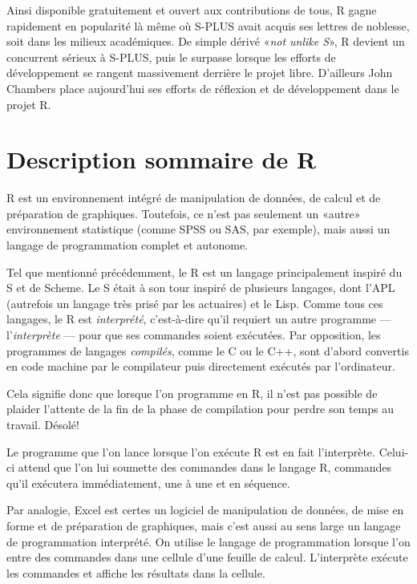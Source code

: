\documentclass[11pt,french]{memoir}
\begin{document}
Ainsi disponible gratuitement et ouvert aux contributions de tous,
R gagne rapidement en popularité là même où S-PLUS avait acquis ses
lettres de noblesse, soit dans les milieux académiques. De simple
dérivé «\emph{not unlike S}», R devient un concurrent sérieux à
S-PLUS, puis le surpasse lorsque les efforts de développement se
rangent massivement derrière le projet libre. D'ailleurs John Chambers
place aujourd'hui ses efforts de réflexion et de développement dans le
projet R.


\section{Description sommaire de R}
\label{sec:rpresentation:description}

R est un environnement intégré de manipulation de données, de calcul
et de préparation de graphiques. Toutefois, ce n'est pas seulement un
«autre» environnement statistique (comme SPSS ou SAS, par exemple),
mais aussi un langage de programmation complet et autonome.

Tel que mentionné précédemment, le R est un langage principalement
inspiré du S et de Scheme. Le S était à son tour inspiré de plusieurs
langages, dont l'APL (autrefois un langage très prisé par les
actuaires) et le Lisp. Comme tous ces langages, le R est
\emph{interprété}, c'est-à-dire qu'il requiert un autre programme ---
l'\emph{interprète} --- pour que ses commandes soient exécutées. Par
opposition, les programmes de langages \emph{compilés}, comme le C ou
le C++, sont d'abord convertis en code machine par le compilateur puis
directement exécutés par l'ordinateur.

Cela signifie donc que lorsque l'on programme en R, il n'est pas
possible de plaider l'attente de la fin de la phase de compilation
pour perdre son temps au travail. Désolé!

Le programme que l'on lance lorsque l'on exécute R est en fait
l'interprète. Celui-ci attend que l'on lui soumette des commandes dans
le langage R, commandes qu'il exécutera immédiatement, une à une et
en séquence.

Par analogie, Excel est certes un logiciel de manipulation de données,
de mise en forme et de préparation de graphiques, mais c'est aussi au
sens large un langage de programmation interprété. On utilise le
langage de programmation lorsque l'on entre des commandes dans une
cellule d'une feuille de calcul. L'interprète exécute les commandes et
affiche les résultats dans la cellule.
\end{document}
